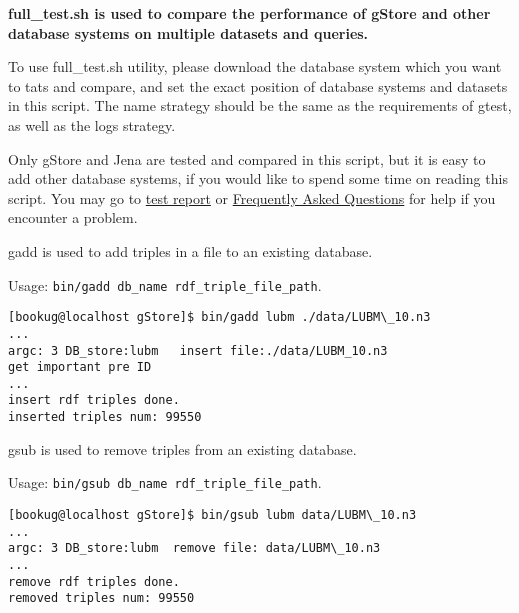 \documentclass[titlepage, a4paper, 12pt]{article}
\begin{document}
\textbf{full\_test.sh is used to compare the performance of gStore and
other database systems on multiple datasets and queries.}

To use full\_test.sh utility, please download the database system which
you want to tats and compare, and set the exact position of database
systems and datasets in this script. The name strategy should be the
same as the requirements of gtest, as well as the logs strategy.

Only gStore and Jena are tested and compared in this script, but it is
easy to add other database systems, if you would like to spend some time
on reading this script. You may go to
\href{run:../pdf/gstore���Ա���.pdf}{test
report} or \hyperref[chapter11]{Frequently Asked Questions} for help if
you encounter a problem.


gadd is used to add triples in a file to an existing database.

Usage: \texttt{bin/gadd db\_name rdf\_triple\_file\_path}.

\begin{verbatim}
[bookug@localhost gStore]$ bin/gadd lubm ./data/LUBM\_10.n3
...
argc: 3 DB_store:lubm   insert file:./data/LUBM_10.n3
get important pre ID
...
insert rdf triples done.
inserted triples num: 99550
\end{verbatim}


gsub is used to remove triples from an existing database.

Usage: \texttt{bin/gsub db\_name rdf\_triple\_file\_path}.

\begin{verbatim}
[bookug@localhost gStore]$ bin/gsub lubm data/LUBM\_10.n3
...
argc: 3 DB_store:lubm  remove file: data/LUBM\_10.n3
...
remove rdf triples done.
removed triples num: 99550
\end{verbatim}

\end{document}
